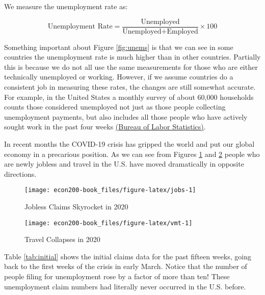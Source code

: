 \documentclass[
]{book}
\begin{document}
We measure the unemployment rate as:

\[ \text{Unemployment Rate} = \frac{\text{Unemployed}}{\text{Unemployed} + \text{Employed}} \times 100 \]

Something important about Figure \ref{fig:unems} is that we can see in some countries the unemployment rate is much higher than in other countries. Partially this is because we do not all use the same measurements for those who are either technically unemployed or working. However, if we assume countries do a consistent job in measuring these rates, the changes are still somewhat accurate. For example, in the United States a monthly survey of about 60,000 households counts those considered unemployed not just as those people collecting unemployment payments, but also includes all those people who have actively sought work in the past four weeks \href{https://www.bls.gov/cps/cps_htgm.htm}{(Bureau of Labor Statistics)}.

In recent months the COVID-19 crisis has gripped the world and put our global economy in a precarious position. As we can see from Figures \ref{fig:jobs} and \ref{fig:vmt} people who are newly jobless and travel in the U.S. have moved dramatically in opposite directions.

\begin{figure}

{\centering \texttt{[image: econ200-book\_files/figure-latex/jobs-1]} 

}

\caption{Jobless Claims Skyrocket in 2020}\label{fig:jobs}
\end{figure}

\begin{figure}

{\centering \texttt{[image: econ200-book\_files/figure-latex/vmt-1]} 

}

\caption{Travel Collapses in 2020}\label{fig:vmt}
\end{figure}

Table \ref{tab:initial} shows the initial claims data for the past fifteen weeks, going back to the first weeks of the crisis in early March. Notice that the number of people filing for unemployment rose by a factor of more than ten! These unemployment claim numbers had literally never occurred in the U.S. before.
\end{document}
